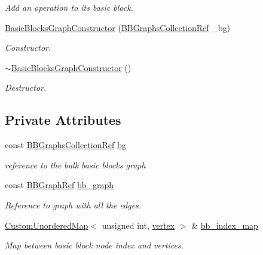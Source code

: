 \begin{DoxyCompactItemize}
\begin{DoxyCompactList}\small\item\em Add an operation to its basic block. \end{DoxyCompactList}\item 
\hyperlink{classBasicBlocksGraphConstructor_a322811f80dc48d4aa33e5e94381876f1}{Basic\+Blocks\+Graph\+Constructor} (\hyperlink{basic__block_8hpp_ab2c15dfa325570d7a3e0e364c2f5fdfa}{B\+B\+Graphs\+Collection\+Ref} \+\_\+bg)
\begin{DoxyCompactList}\small\item\em Constructor. \end{DoxyCompactList}\item 
\hyperlink{classBasicBlocksGraphConstructor_aa430cf8dac4feace5513ed2e55015380}{$\sim$\+Basic\+Blocks\+Graph\+Constructor} ()
\begin{DoxyCompactList}\small\item\em Destructor. \end{DoxyCompactList}\end{DoxyCompactItemize}
\subsection*{Private Attributes}
\begin{DoxyCompactItemize}
\item 
const \hyperlink{basic__block_8hpp_ab2c15dfa325570d7a3e0e364c2f5fdfa}{B\+B\+Graphs\+Collection\+Ref} \hyperlink{classBasicBlocksGraphConstructor_a8034e72b335aab8080616019aaa34629}{bg}
\begin{DoxyCompactList}\small\item\em reference to the bulk basic blocks graph \end{DoxyCompactList}\item 
const \hyperlink{basic__block_8hpp_a0e7f233d1b83cad0bfd5aa865f0d3532}{B\+B\+Graph\+Ref} \hyperlink{classBasicBlocksGraphConstructor_a5b58e113f4d0047b5e496f3d10f66cee}{bb\+\_\+graph}
\begin{DoxyCompactList}\small\item\em Reference to graph with all the edges. \end{DoxyCompactList}\item 
\hyperlink{custom__map_8hpp_ad1ed68f2ff093683ab1a33522b144adc}{Custom\+Unordered\+Map}$<$ unsigned int, \hyperlink{graph_8hpp_abefdcf0544e601805af44eca032cca14}{vertex} $>$ \& \hyperlink{classBasicBlocksGraphConstructor_af102a32f04473992c84296a85ed0e86c}{bb\+\_\+index\+\_\+map}
\begin{DoxyCompactList}\small\item\em Map between basic block node index and vertices. \end{DoxyCompactList}\end{DoxyCompactItemize}


